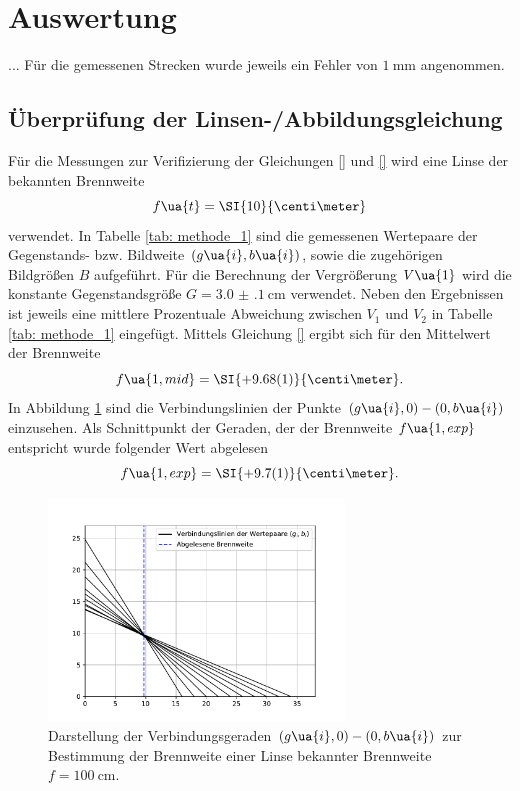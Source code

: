 \section{Auswertung}
...
Für die gemessenen Strecken wurde jeweils ein Fehler von $\SI{1}{\milli\meter}$ angenommen.

\subsection{Überprüfung der Linsen-/Abbildungsgleichung}
Für die Messungen zur Verifizierung der Gleichungen \eqref{} und \eqref{} wird eine Linse
der bekannten Brennweite
\begin{equation}
  f\ua{t} = \SI{10}{\centi\meter}
\end{equation}
verwendet. In Tabelle \ref{tab: methode_1} sind die gemessenen Wertepaare der Gegenstands- bzw. Bildweite $(g\ua{i}, b\ua{i})$,
sowie die zugehörigen Bildgrößen $B$ aufgeführt. Für die Berechnung der Vergrößerung $V\ua{1}$
wird die konstante Gegenstandsgröße $G = \SI{3.0(1)}{\centi\meter}$ verwendet. Neben den Ergebnissen ist jeweils
eine mittlere Prozentuale Abweichung zwischen $V_1$ und $V_2$ in Tabelle \ref{tab: methode_1} eingefügt.
Mittels Gleichung \eqref{} ergibt sich für den Mittelwert der Brennweite
\begin{equation}
  f\ua{1, mid} = \SI{+9.68(1)}{\centi\meter}.
\end{equation}
In Abbildung \ref{fig: methode_1} sind die Verbindungslinien der Punkte $(g\ua{i}, 0)-(0, b\ua{i})$ einzusehen. Als Schnittpunkt
der Geraden, der der Brennweite $f\ua{1, exp}$ entspricht wurde folgender Wert abgelesen
\begin{equation}
  f\ua{1, exp} = \SI{+9.7(1)}{\centi\meter}.
\end{equation}
\begin{figure}
  \centering
  \includegraphics[width=0.7\textwidth]{../Messdaten/plots/methode_1.pdf}
  \caption{Darstellung der Verbindungsgeraden $(g\ua{i}, 0) - (0, b\ua{i})$ zur Bestimmung der Brennweite einer
  Linse bekannter Brennweite $f = \SI{100}{\centi\meter}$.}
  \label{fig: methode_1}
\end{figure}


